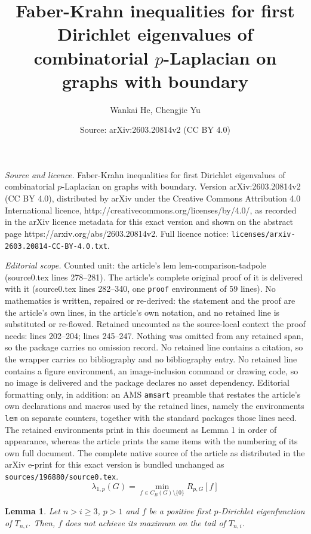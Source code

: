 \documentclass[10pt,a4paper]{amsart}
\title{Faber-Krahn inequalities for first Dirichlet eigenvalues of combinatorial $p$-Laplacian on graphs with boundary}
\author{Wankai He, Chengjie Yu}
\date{Source: arXiv:2603.20814v2 (CC BY 4.0)}
\newtheorem{lem}{Lemma}
\begin{document}
\maketitle

\noindent\emph{Source and licence.} Faber-Krahn inequalities for first Dirichlet eigenvalues of combinatorial $p$-Laplacian on graphs with boundary. Version arXiv:2603.20814v2 (CC BY 4.0), distributed by arXiv under the Creative Commons Attribution 4.0 International licence, http://creativecommons.org/licenses/by/4.0/, as recorded in the arXiv licence metadata for this exact version and shown on the abstract page https://arxiv.org/abs/2603.20814v2. Full licence notice: \texttt{licenses/arxiv-2603.20814-CC-BY-4.0.txt}.\par\smallskip

\noindent\textit{Editorial scope.} Counted unit: the article's lem lem-comparison-tadpole (source0.tex lines 278--281). The article's complete original proof of it is delivered with it (source0.tex lines 282--340, one \texttt{proof} environment of 59 lines). No mathematics is written, repaired or re-derived: the statement and the proof are the article's own lines, in the article's own notation, and no retained line is substituted or re-flowed.  Retained uncounted as the source-local context the proof needs: lines 202--204; lines 245--247.  Nothing was omitted from any retained span, so the package carries no omission record.  No retained line contains a citation, so the wrapper carries no bibliography and no bibliography entry.  No retained line contains a figure environment, an image-inclusion command or drawing code, so no image is delivered and the package declares no asset dependency.  Editorial formatting only, in addition: an AMS \texttt{amsart} preamble that restates the article's own declarations and macros used by the retained lines, namely the environments \texttt{lem} on separate counters, together with the standard packages those lines need.  The retained environments print in this document as Lemma 1 in order of appearance, whereas the article prints the same items with the numbering of its own full document.  The complete native source of the article as distributed in the arXiv e-print for this exact version is bundled unchanged as \texttt{sources/196880/source0.tex}.
\begin{equation}\label{eq-Rayleigh}
\lambda_{1,p}(G)=\min_{f\in C_B(G)\setminus\{0\}}R_{p,G}[f]
\end{equation}

\begin{lem}\label{lem-max-in-head}
 Let $n>i\geq 3$, $p>1$ and $f$ be a positive first $p$-Dirichlet eigenfunction of $T_{n,i}$. Then, $f$ does not achieve its maximum on the tail of $T_{n,i}$.
\end{lem}
\end{document}
